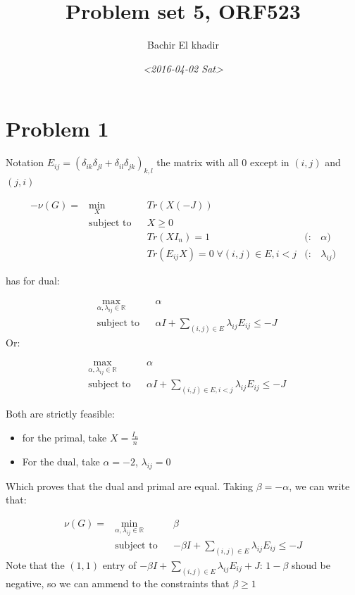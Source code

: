 \documentclass[11pt]{article}
\author{Bachir El khadir}
\date{\textit{<2016-04-02 Sat>}}
\title{Problem set 5, ORF523}
\begin{document}
\maketitle


\section{Problem 1}
\label{sec:orgheadline1}


Notation \(E_{ij} = (\delta_{ik}\delta_{jl} + \delta_{il}\delta_{jk})_{k,l}\) the matrix with all 0 except in \((i, j)\) and \((j, i)\)


\begin{align*}
-\nu(G) =
& \underset{X}{\text{min}}
& & Tr(X(-J)) \\
& \text{subject to}
& & X \ge 0
\\&&& Tr(XI_n) = 1 &(:& \alpha)
\\&&&Tr(E_{ij}X) = 0 \; \forall (i,j) \in E, i < j &(:& \lambda_{ij})
\end{align*}

has  for dual:

\begin{align*}
& \underset{\alpha, \lambda_{ij} \in \mathbb R}{\text{max}}
& & \alpha \\
& \text{subject to}
& & \alpha I + \sum_{(i,j) \in E} \lambda_{ij} E_{ij} \le -J
\end{align*}
Or:

\begin{align*}
& \underset{\alpha, \lambda_{ij} \in \mathbb R}{\text{max}}
& & \alpha \\
& \text{subject to}
& & \alpha I + \sum_{(i,j) \in E, i < j} \lambda_{ij} E_{ij} \le -J
\end{align*}


Both are strictly feasible:
\begin{itemize}
\item for the primal, take \(X = \frac{I_n}n\)
\item For the dual, take \(\alpha = -2\), \(\lambda_{ij} = 0\)
\end{itemize}
Which proves that the dual and primal are equal. Taking  \(\beta = -\alpha\), we can write that:



\begin{align*}
\nu(G) = 
& \underset{\alpha, \lambda_{ij} \in \mathbb R}{\text{min}}
& & \beta \\
& \text{subject to}
& & -\beta I + \sum_{(i,j) \in E} \lambda_{ij} E_{ij} \le -J
\end{align*}
Note that the \((1, 1)\) entry of \(-\beta I + \sum_{(i,j) \in E} \lambda_{ij} E_{ij} + J\): \(1-\beta\) shoud be negative, so we can ammend to the constraints that \(\beta \ge 1\)
\end{document}
